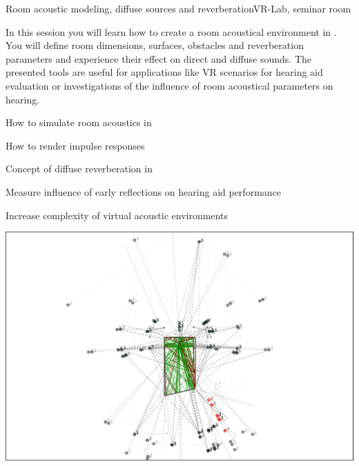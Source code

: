 \documentclass[11pt,a4paper,twoside]{article}
\begin{document}
\setcounter{tutorial}{3}
\begin{tutorial}{Room acoustic modeling, diffuse sources and reverberation}{VR-Lab, seminar room}

In this session you will learn how to create a room acoustical
environment in \tascar{}.
%
You will define room dimensions, surfaces, obstacles and reverberation
parameters and experience their effect on direct and diffuse
sounds.
%
The presented tools are useful for applications like VR scenarios for
hearing aid evaluation or investigations of the influence of room
acoustical parameters on hearing.

\begin{learnitems}
\item How to simulate room acoustics in \tascar{}
\item How to render impulse responses
\item Concept of diffuse reverberation in \tascar{}
\end{learnitems}

\begin{appitems}
\item Measure influence of early reflections on hearing aid performance
\item Increase complexity of virtual acoustic environments
\end{appitems}

\medskip

\centerline{\includegraphics[width=0.9\columnwidth]{t4_acmodel}}

\end{tutorial}

\ifshowtutorial

\newpage
\end{document}
